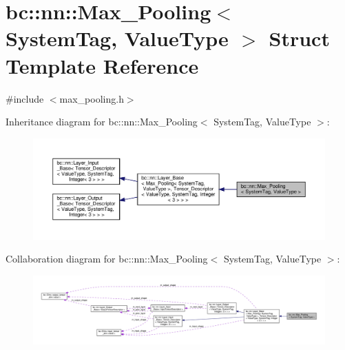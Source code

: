 \hypertarget{structbc_1_1nn_1_1Max__Pooling}{}\section{bc\+:\+:nn\+:\+:Max\+\_\+\+Pooling$<$ System\+Tag, Value\+Type $>$ Struct Template Reference}
\label{structbc_1_1nn_1_1Max__Pooling}


{\ttfamily \#include $<$max\+\_\+pooling.\+h$>$}



Inheritance diagram for bc\+:\+:nn\+:\+:Max\+\_\+\+Pooling$<$ System\+Tag, Value\+Type $>$\+:\nopagebreak
\begin{figure}[H]
\begin{center}
\leavevmode
\includegraphics[width=350pt]{structbc_1_1nn_1_1Max__Pooling__inherit__graph}
\end{center}
\end{figure}


Collaboration diagram for bc\+:\+:nn\+:\+:Max\+\_\+\+Pooling$<$ System\+Tag, Value\+Type $>$\+:\nopagebreak
\begin{figure}[H]
\begin{center}
\leavevmode
\includegraphics[width=350pt]{structbc_1_1nn_1_1Max__Pooling__coll__graph}
\end{center}
\end{figure}
